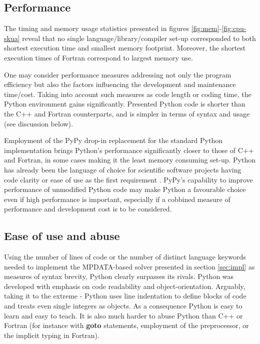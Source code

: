\documentclass[final,5p,times,twocolumn]{elsarticle}
\newcommand{\prog}[1]{{\rm\bf#1}}
\begin{document}
  \subsection{Performance}
  
  The timing and memory usage statistics presented in figures \ref{fig:mem}-\ref{fig:cpu-skua}
    reveal that no single language/library/compiler set-up 
    corresponded to both shortest execution time and smallest memory footprint.
  Moreover, the shortest execution times of Fortran correspond to largest memory use.

  One may consider performance measures addressing not only the program efficiency but also 
    the factors influencing the development and maintenance time/cost.
  Taking into account such measures as code length or coding time,
    the Python environment gains significantly.
  Presented Python code is shorter than the C++ and Fortran counterparts,
    and is simpler in terms of syntax and usage (see discussion below).

  Employment of the PyPy drop-in replacement for the standard Python implementation brings 
    Python's performance significantly closer to those of C++ and Fortran, in some
    cases making it the least memory consuming set-up.
  Python has already been the language of choice for scientific software projects having code clarity 
    or ease of use as the first requirement \citep[see e.g.][]{Barnes_and_Jones_2011}.
  PyPy's capability to improve performance of unmodified Python code may 
    make Python a favourable choice even if high performance is important, especially
    if a cobbined measure of performance and development cost is to be considered. 

  \subsection{Ease of use and abuse}

  Using the number of lines of code or the number of distinct language keywords
    needed to implement the MPDATA-based
    solver presented in section \ref{sec:impl} as measures of syntax 
    brevity, Python clearly surpasses its rivals.
  Python was developed with emphasis on code readability and object-orientation.
  Arguably, taking it to the extreme - Python uses line indentation to define 
    blocks of code and treats even single integers as objects.
  As a consequence Python is easy to learn and easy to teach.
  It is also much harder to abuse Python than C++ or Fortran
    (for instance with \prog{goto} statements, employment of the preprocessor,
    or the implicit typing in Fortran).
\end{document}
